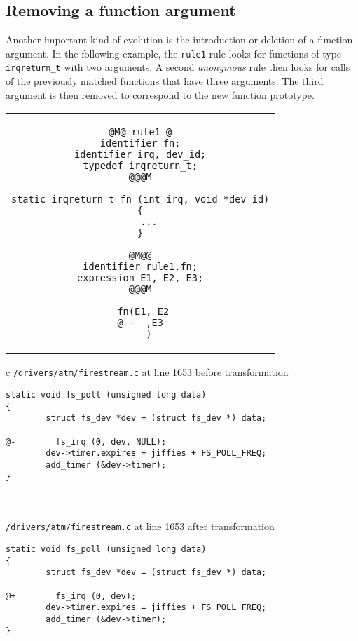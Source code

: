 \newpage
\subsection{Removing a function argument}

Another important kind of evolution is the introduction or deletion of
a function argument. In the following example, the \texttt{rule1} rule
looks for functions of type \texttt{irqreturn\_t} with two
arguments. A second \emph{anonymous} rule then looks for calls of the
previously matched functions that have three arguments. The third
argument is then removed to correspond to the new function prototype.\\

\begin{tabular}{c}
\begin{lstlisting}[language=Cocci,name=arg]
@M@ rule1 @
identifier fn;
identifier irq, dev_id;
typedef irqreturn_t;
@@@M

static irqreturn_t fn (int irq, void *dev_id)
{
   ...
}

@M@@
identifier rule1.fn;
expression E1, E2, E3;
@@@M

 fn(E1, E2
@--  ,E3
   )
\end{lstlisting}\\
\end{tabular}

\vspace{1cm}

\begin{tabular}{c}
  \texttt{/drivers/atm/firestream.c} at line 1653 before transformation\\
\begin{lstlisting}[language=PatchC]
static void fs_poll (unsigned long data)
{
        struct fs_dev *dev = (struct fs_dev *) data;

@-        fs_irq (0, dev, NULL);
        dev->timer.expires = jiffies + FS_POLL_FREQ;
        add_timer (&dev->timer);
}
\end{lstlisting}\\
\vspace{1cm}
\\


  \texttt{/drivers/atm/firestream.c} at line 1653 after transformation\\
\begin{lstlisting}[language=PatchC]
static void fs_poll (unsigned long data)
{
        struct fs_dev *dev = (struct fs_dev *) data;

@+        fs_irq (0, dev);
        dev->timer.expires = jiffies + FS_POLL_FREQ;
        add_timer (&dev->timer);
}
\end{lstlisting}\\
\end{tabular}

